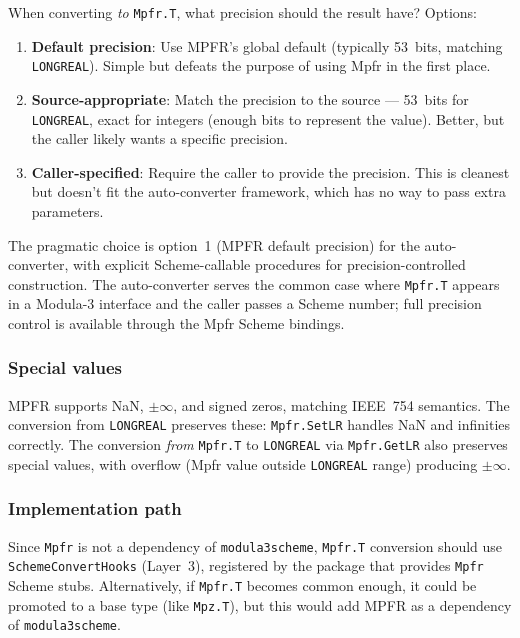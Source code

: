 \documentclass[11pt]{article}
\begin{document}
When converting \emph{to} \texttt{Mpfr.T}, what precision should the
result have?  Options:

\begin{enumerate}
\item \textbf{Default precision}: Use MPFR's global default (typically
  53~bits, matching \texttt{LONGREAL}).  Simple but defeats the purpose
  of using Mpfr in the first place.
\item \textbf{Source-appropriate}: Match the precision to the source ---
  53~bits for \texttt{LONGREAL}, exact for integers (enough bits to
  represent the value).  Better, but the caller likely wants a specific
  precision.
\item \textbf{Caller-specified}: Require the caller to provide the
  precision.  This is cleanest but doesn't fit the auto-converter
  framework, which has no way to pass extra parameters.
\end{enumerate}

The pragmatic choice is option~1 (MPFR default precision) for the
auto-converter, with explicit Scheme-callable procedures for
precision-controlled construction.  The auto-converter serves the
common case where \texttt{Mpfr.T} appears in a Modula-3 interface and
the caller passes a Scheme number; full precision control is available
through the Mpfr Scheme bindings.

\subsubsection{Special values}

MPFR supports NaN, $\pm\infty$, and signed zeros, matching IEEE~754
semantics.  The conversion from \texttt{LONGREAL} preserves these:
\texttt{Mpfr.SetLR} handles NaN and infinities correctly.  The
conversion \emph{from} \texttt{Mpfr.T} to \texttt{LONGREAL} via
\texttt{Mpfr.GetLR} also preserves special values, with overflow
(Mpfr value outside \texttt{LONGREAL} range) producing $\pm\infty$.

\subsubsection{Implementation path}

Since \texttt{Mpfr} is not a dependency of \texttt{modula3scheme},
\texttt{Mpfr.T} conversion should use \texttt{SchemeConvertHooks}
(Layer~3), registered by the package that provides \texttt{Mpfr}
Scheme stubs.  Alternatively, if \texttt{Mpfr.T} becomes common
enough, it could be promoted to a base type (like \texttt{Mpz.T}),
but this would add MPFR as a dependency of \texttt{modula3scheme}.
\end{document}
